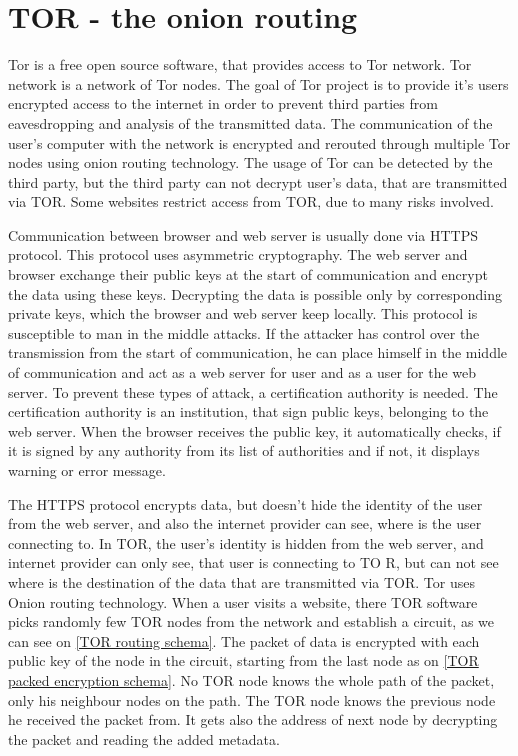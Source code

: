 \documentclass[
  digital, %
  table,   %
  lof,     %
  lot,     %
  oneside
]{fithesis3}
\begin{document}
\section{TOR - the onion routing}

Tor \parencite{dingledine2004tor} is a free open source software, that provides access to Tor network. Tor network is a network of Tor nodes.
The goal of Tor project is to provide it's users encrypted access to the internet in order to prevent third parties
from eavesdropping and analysis of the transmitted data.
The communication of the user's computer with the network is encrypted and rerouted through multiple Tor nodes using onion routing technology.
The usage of Tor can be detected by the third party, but the third party can not decrypt user's data, that are transmitted
 via TOR.
Some websites restrict access from TOR, due to many risks involved.

Communication between browser and web server is usually done via HTTPS protocol.
This protocol uses asymmetric cryptography. The web server and browser exchange their public keys at the start of communication
and encrypt the data using these keys. Decrypting the data is possible only by corresponding private keys,
which the browser and web server keep locally. This protocol is susceptible to man in the middle attacks.
If the attacker has control over the transmission from the start of communication, he can place himself in the middle of communication and act as a web server for user and as a user for the web server. To prevent these types of attack,
 a certification authority is needed. The certification authority is an institution, that sign public keys, belonging to the web server.
 When the browser receives the public key, it automatically checks, if it is signed by any authority from its list of authorities and if not, it displays warning or error message.
 
The HTTPS protocol encrypts data, but doesn't hide the identity of the user from the web server,
 and also the internet provider can see, where is the user connecting to.
 In TOR, the user's identity is hidden from the web server, and internet provider can only see, that user is connecting to TO
R, but can not see where is the destination of the data that are transmitted via TOR.
 Tor uses Onion routing technology. When a user visits a website, there TOR software picks randomly few TOR nodes from the network and establish a circuit, as we can see on \ref{TOR routing schema}. 
 The packet of data is encrypted with each public key of the node in the circuit, starting from the last node as on \ref{TOR
 packed encryption schema}.
 No TOR node knows the whole path of the packet, only his neighbour nodes on the path.
 The TOR node knows the previous node he received the packet from. It gets also the address 
 of next node by decrypting the packet and reading the added metadata.
 
\end{document}
